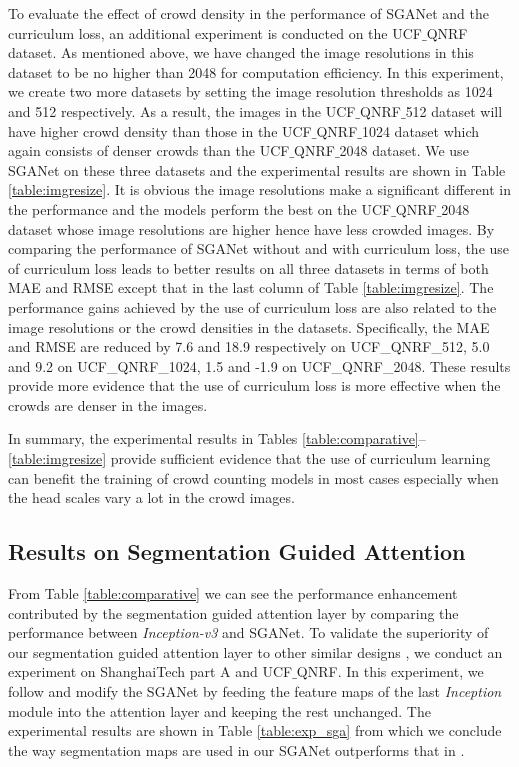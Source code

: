 \documentclass[journal,comsoc]{IEEEtran}
\begin{document}
To evaluate the effect of crowd density in the performance of SGANet and the curriculum loss, an additional experiment is conducted on the UCF$\_$QNRF dataset. As mentioned above, we have changed the image resolutions in this dataset to be no higher than 2048 for computation efficiency. In this experiment, we create two more datasets by setting the image resolution thresholds as 1024 and 512 respectively. As a result, the images in the UCF$\_$QNRF$\_$512 dataset will have higher crowd density than those in the UCF$\_$QNRF$\_$1024 dataset which again consists of denser crowds than the UCF$\_$QNRF$\_$2048 dataset. We use SGANet on these three datasets and the experimental results are shown in Table \ref{table:imgresize}. It is obvious the image resolutions make a significant different in the performance and the models perform the best on the UCF$\_$QNRF$\_$2048 dataset whose image resolutions are higher hence have less crowded images. By comparing the performance of SGANet without and with curriculum loss, the use of curriculum loss leads to better results on all three datasets in terms of both MAE and RMSE except that in the last column of Table \ref{table:imgresize}. The performance gains achieved by the use of curriculum loss are also related to the image resolutions or the crowd densities in the datasets. 
Specifically, the MAE and RMSE are reduced by 7.6 and 18.9 respectively on UCF\_QNRF\_512, 5.0 and 9.2 on UCF\_QNRF\_1024, 1.5 and -1.9 on UCF\_QNRF\_2048. These results provide more evidence that the use of curriculum loss is more effective when the crowds are denser in the images.

In summary, the experimental results in Tables \ref{table:comparative}--\ref{table:imgresize} provide sufficient evidence that the use of curriculum learning can benefit the training of crowd counting models in most cases especially when the head scales vary a lot in the crowd images.

\subsection{Results on Segmentation Guided Attention}\label{sec:exp_sga}

From Table \ref{table:comparative} we can see the performance enhancement contributed by the segmentation guided attention layer by comparing the performance between \textit{Inception-v3} and SGANet. To validate the superiority of our segmentation guided attention layer to other similar designs \cite{shi2019counting}, we conduct an experiment on ShanghaiTech part A and UCF$\_$QNRF. In this experiment, we follow \cite{shi2019counting} and modify the SGANet by feeding the feature maps of the last \textit{Inception} module into the attention layer and keeping the rest unchanged. The experimental results are shown in Table \ref{table:exp_sga} from which we conclude the way segmentation maps are used in our SGANet outperforms that in \cite{shi2019counting}.
\end{document}
